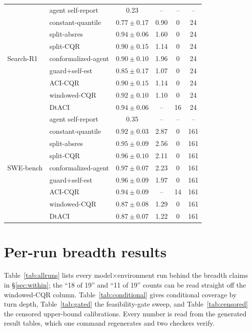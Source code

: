 \documentclass{article}
\begin{document}
\begin{table}[t]
\begin{tabular}{@{}llcccc@{}}
\midrule
\multirow{9}{*}{Search-R1}
 & agent self-report & 0.23 & -- & -- & -- \\
 & constant-quantile & $0.77\pm0.17$ & 0.90 & 0 & 24 \\
 & split-absres & $0.94\pm0.06$ & 1.60 & 0 & 24 \\
 & split-CQR & $0.90\pm0.15$ & 1.14 & 0 & 24 \\
 & conformalized-agent & $0.90\pm0.10$ & 1.96 & 0 & 24 \\
 & guard+self-est & $0.85\pm0.17$ & 1.07 & 0 & 24 \\
 & ACI-CQR & $0.90\pm0.15$ & 1.14 & 0 & 24 \\
 & windowed-CQR & $0.92\pm0.10$ & 1.10 & 0 & 24 \\
 & DtACI & $0.94\pm0.06$ & -- & 16 & 24 \\
\midrule
\multirow{9}{*}{SWE-bench}
 & agent self-report & 0.35 & -- & -- & -- \\
 & constant-quantile & $0.92\pm0.03$ & 2.87 & 0 & 161 \\
 & split-absres & $0.95\pm0.09$ & 2.56 & 0 & 161 \\
 & split-CQR & $0.96\pm0.10$ & 2.11 & 0 & 161 \\
 & conformalized-agent & $0.97\pm0.07$ & 2.23 & 0 & 161 \\
 & guard+self-est & $0.96\pm0.09$ & 1.97 & 0 & 161 \\
 & ACI-CQR & $0.94\pm0.09$ & -- & 14 & 161 \\
 & windowed-CQR & $0.87\pm0.08$ & 1.29 & 0 & 161 \\
 & DtACI & $0.87\pm0.07$ & 1.22 & 0 & 161 \\
\bottomrule
\end{tabular}
\end{table}

\section{Per-run breadth results}
\label{app:breadth}

Table~\ref{tab:allruns} lists every model$\times$environment run behind the breadth claims in \S\ref{sec:within}; the ``18 of 19'' and ``11 of 19'' counts can be read straight off the windowed-CQR column. Table~\ref{tab:conditional} gives conditional coverage by turn depth, Table~\ref{tab:gated} the feasibility-gate sweep, and Table~\ref{tab:censored} the censored upper-bound calibrations. Every number is read from the generated result tables, which one command regenerates and two checkers verify.
\end{document}
